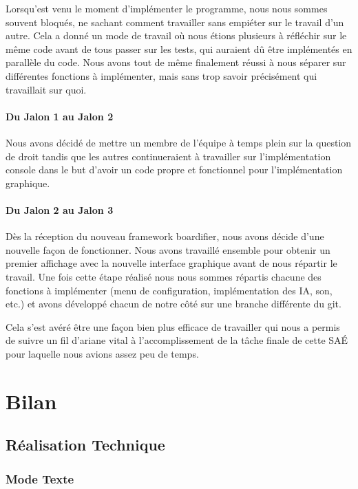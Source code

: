 Lorsqu'est venu le moment d'implémenter le programme, nous nous sommes souvent bloqués, ne sachant comment travailler sans empiéter sur le travail d'un autre.
Cela a donné un mode de travail où nous étions plusieurs à réfléchir sur le même code avant de tous passer sur les tests, qui auraient dû être implémentés en parallèle du code.
Nous avons tout de même finalement réussi à nous séparer sur différentes fonctions à implémenter, mais sans trop savoir précisément qui travaillait sur quoi.

\subsubsection{Du Jalon 1 au Jalon 2}

Nous avons décidé de mettre un membre de l'équipe à temps plein sur la question de droit tandis que les autres continueraient à travailler sur l'implémentation console dans le but d'avoir un code propre et fonctionnel pour l'implémentation graphique.

\subsubsection{Du Jalon 2 au Jalon 3}

Dès la réception du nouveau framework boardifier, nous avons décide d'une nouvelle façon de fonctionner.
Nous avons travaillé ensemble pour obtenir un premier affichage avec la nouvelle interface graphique avant de nous répartir le travail.
Une fois cette étape réalisé nous nous sommes répartis chacune des fonctions à implémenter (menu de configuration, implémentation des IA, son, etc.) et avons développé chacun de notre côté sur une branche différente du git.

Cela s'est avéré être une façon bien plus efficace de travailler qui nous a permis de suivre un fil d'ariane vital à l'accomplissement de la tâche finale de cette SAÉ pour laquelle nous avions assez peu de temps.


\chapter{Bilan}

\section{Réalisation Technique}

\subsection*{Mode Texte}

